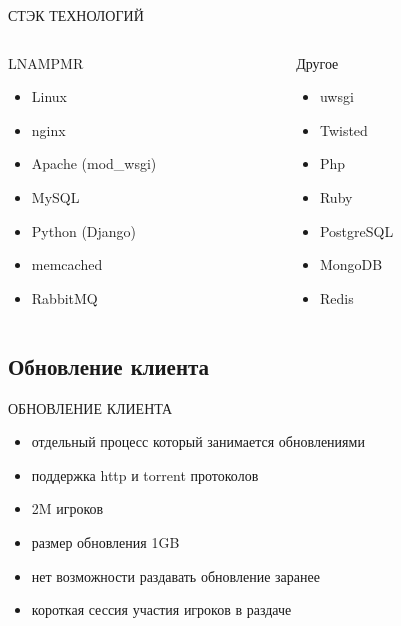 \documentclass[aspectratio=169]{beamer}
\begin{document}
\begin{frame}{СТЭК ТЕХНОЛОГИЙ}
    \begin{columns}
        \begin{column}{0.4\textwidth}
            \begin{block}{LNAMPMR}
            \begin{itemize}
                \item Linux
                \item nginx
                \item Apache (mod\_wsgi)
                \item MySQL
                \item Python (Django)
                \item memcached
                \item RabbitMQ
            \end{itemize}
            \end{block}
        \end{column}

        \begin{column}{0.4\textwidth}
            \begin{block}{Другое}
            \begin{itemize}
                \item uwsgi
                \item Twisted
                \item Php
                \item Ruby
                \item PostgreSQL
                \item MongoDB
                \item Redis
            \end{itemize}
            \end{block}
        \end{column}
    \end{columns}
\end{frame}

\subsection{Обновление клиента}

\begin{frame}{ОБНОВЛЕНИЕ КЛИЕНТА}
    \begin{itemize}
        \item отдельный процесс который занимается обновлениями
        \item поддержка http и torrent протоколов
        \item 2M игроков
        \item размер обновления 1GB
        \item нет возможности раздавать обновление заранее
        \item короткая сессия участия игроков в раздаче
    \end{itemize}
\end{frame}
\end{document}

